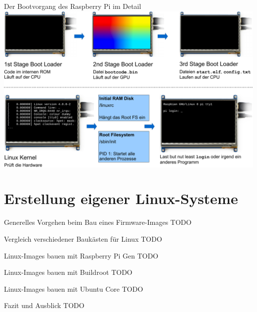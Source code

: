 \begin{frame}{Der Bootvorgang des Raspberry Pi im Detail}
    \includegraphics[width=\textwidth]{8-linux/img/pi-bootvorgang}
\end{frame}


\section{Erstellung eigener Linux-Systeme}

\begin{frame}{Generelles Vorgehen beim Bau eines Firmware-Images}
    TODO
\end{frame}

\begin{frame}{Vergleich verschiedener Baukästen für Linux}
    TODO
\end{frame}

\begin{frame}{Linux-Images bauen mit Raspberry Pi Gen}
    TODO
\end{frame}

\begin{frame}{Linux-Images bauen mit Buildroot}
    TODO
\end{frame}

\begin{frame}{Linux-Images bauen mit Ubuntu Core}
    TODO
\end{frame}

\begin{frame}{Fazit und Ausblick}
    TODO
\end{frame}

